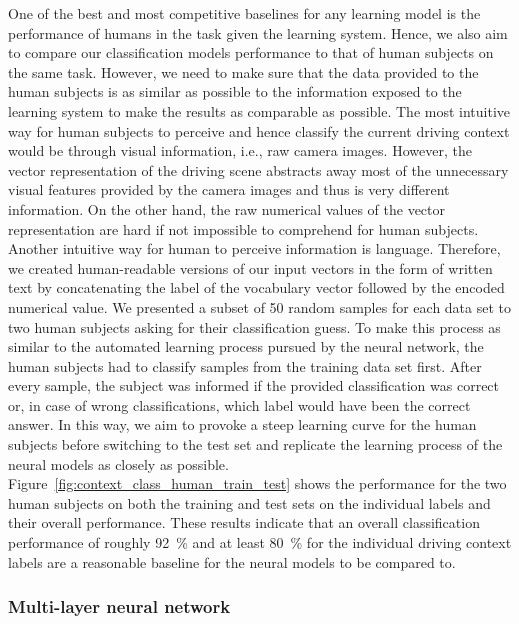 One of the best and most competitive baselines for any learning model is the performance of humans in the task given the learning system.
Hence, we also aim to compare our classification models performance to that of human subjects on the same task.
However, we need to make sure that the data provided to the human subjects is as similar as possible to the information exposed to the learning system to make the results as comparable as possible.
The most intuitive way for human subjects to perceive and hence classify the current driving context would be through visual information, i.e., raw camera images.
However, the vector representation of the driving scene abstracts away most of the unnecessary visual features provided by the camera images and thus is very different information.
On the other hand, the raw numerical values of the vector representation are hard if not impossible to comprehend for human subjects.
Another intuitive way for human to perceive information is language.
Therefore, we created human-readable versions of our input vectors in the form of written text by concatenating the label of the vocabulary vector followed by the encoded numerical value.
We presented a subset of \num{50} random samples for each data set to two human subjects asking for their classification guess.
To make this process as similar to the automated learning process pursued by the neural network, the human subjects had to classify samples from the training data set first.
After every sample, the subject was informed if the provided classification was correct or, in case of wrong classifications, which label would have been the correct answer.
In this way, we aim to provoke a steep learning curve for the human subjects before switching to the test set and replicate the learning process of the neural models as closely as possible.
Figure~\ref{fig:context_class_human_train_test} shows the performance for the two human subjects on both the training and test sets on the individual labels and their overall performance.
These results indicate that an overall classification performance of roughly \SI{92}{\percent} and at least \SI{80}{\percent} for the individual driving context labels are a reasonable baseline for the neural models to be compared to.

\subsubsection{Multi-layer neural network}%
\label{ssubsec:multi_layer_neural_network}

